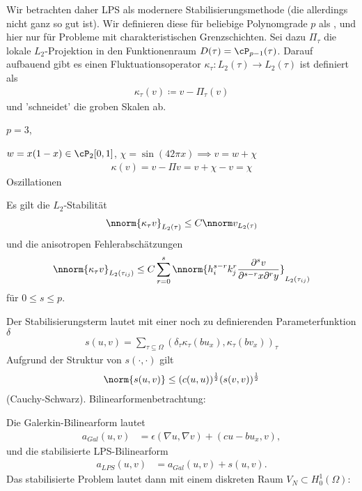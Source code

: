 Wir betrachten daher LPS als modernere Stabilisierungsmethode (die allerdings nicht ganz so gut ist). Wir definieren diese für beliebige Polynomgrade $p$ als , und hier nur für Probleme mit charakteristischen Grenzschichten. Sei dazu $\Pi_{\tau}$ die lokale $L_{2}$-Projektion in den Funktionenraum $D(\tau) = \cP_{p-1}(\tau)$. Darauf aufbauend gibt es einen Fluktuationsoperator $\kappa_{\tau}: L_{2}(\tau) \to L_{2}(\tau)$ ist definiert als
\begin{align*}
  \kappa_{\tau}(v) \coloneqq v - \Pi_{\tau}(v)
\end{align*}
und 'schneidet' die groben Skalen ab. 
\begin{beispiel*} $p = 3$, 

  $w = x(1 - x)\in \cP_{2}[0, 1]$, $\chi = \sin(42 \pi x) \implies v = w +\chi$
  \begin{align*}
    \kappa(v) = v - \Pi v = v + \chi - v = \chi
  \end{align*}
Oszillationen
\end{beispiel*}
Es gilt die $L_{2}$-Stabilität
\begin{align*}
  \nnorm{\kappa_{\tau}v}_{L_{2}(\tau)} \leq C \nnorm v _{L_{2}(\tau)} 
\end{align*}
und die anisotropen Fehlerabschätzungen
\begin{align*}
  \nnorm{\kappa_{\tau} v}_{L_{2}(\tau_{ij})} \leq C \sum_{r = 0}^{s} \nnorm{h^{s-r}_{i} k_{j}^{r} \frac{\partial^{s} v}{\partial^{s-r} x\partial^{r}y}}_{L_{2}(\tau_{ij})}
\end{align*}
für $0 \leq s \leq p$. 

Der Stabilisierungsterm lautet mit einer noch zu definierenden Parameterfunktion $\delta$
\begin{align*}
  s(u, v) = \sum_{\tau \subseteq \Omega} (\delta_{\tau}\kappa_{\tau}(bu_{x}), \kappa_{\tau}(b v_{x}))_{\tau}
\end{align*}
Aufgrund der Struktur von $s(\cdot, \cdot)$ gilt
\begin{align*}
  \norm{s(u, v)} \leq (c(u, u))^{\frac 12} (s(v, v))^{\frac 12}
\end{align*}
(Cauchy-Schwarz). 
Bilinearformenbetrachtung: 

Die Galerkin-Bilinearform lautet
\begin{align*}
  a_{Gal}(u, v) &= \epsilon(\nabla u, \nabla v) + (c u - bu_{x}, v), 
\end{align*}
und die stabilisierte LPS-Bilinearform
\begin{align*}
  a_{LPS}(u, v) &= a_{Gal}(u, v) + s(u, v). 
\end{align*}
Das stabilisierte Problem lautet dann mit einem diskreten Raum $V_{N} \subset H_{0}^{1}(\Omega)$: 

